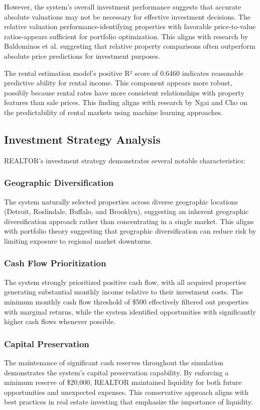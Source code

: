 \documentclass[conference]{IEEEtran}
\begin{document}
However, the system's overall investment performance suggests that accurate absolute valuations may not be necessary for effective investment decisions. The relative valuation performance-identifying properties with favorable price-to-value ratios-appears sufficient for portfolio optimization. This aligns with research by Baldominos et al. \cite{baldominos2018identifying} suggesting that relative property comparisons often outperform absolute price predictions for investment purposes.

The rental estimation model's positive R² score of 0.6460 indicates reasonable predictive ability for rental income. This component appears more robust, possibly because rental rates have more consistent relationships with property features than sale prices. This finding aligns with research by Ngai and Cho \cite{ngai2011application} on the predictability of rental markets using machine learning approaches.

\subsection{Investment Strategy Analysis}
REALTOR's investment strategy demonstrates several notable characteristics:

\subsubsection{Geographic Diversification}
The system naturally selected properties across diverse geographic locations (Detroit, Roslindale, Buffalo, and Brooklyn), suggesting an inherent geographic diversification approach rather than concentrating in a single market. This aligns with portfolio theory suggesting that geographic diversification can reduce risk by limiting exposure to regional market downturns.

\subsubsection{Cash Flow Prioritization}
The system strongly prioritized positive cash flow, with all acquired properties generating substantial monthly income relative to their investment costs. The minimum monthly cash flow threshold of \$500 effectively filtered out properties with marginal returns, while the system identified opportunities with significantly higher cash flows whenever possible.

\subsubsection{Capital Preservation}
The maintenance of significant cash reserves throughout the simulation demonstrates the system's capital preservation capability. By enforcing a minimum reserve of \$20,000, REALTOR maintained liquidity for both future opportunities and unexpected expenses. This conservative approach aligns with best practices in real estate investing that emphasize the importance of liquidity.
\end{document}
